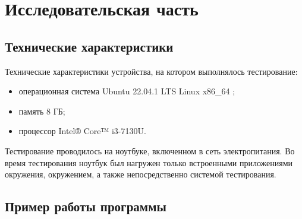 \chapter{Исследовательская часть}

\section{Технические характеристики}

Технические характеристики устройства, на котором выполнялось тестирование:
\begin{itemize}
	\item операционная система Ubuntu 22.04.1 LTS Linux x86\_64 \cite{ubuntu};
	\item память 8 ГБ;
	\item процессор Intel® Core™ i3-7130U.
\end{itemize}

Тестирование проводилось на ноутбуке, включенном в сеть электропитания. Во время тестирования ноутбук был нагружен только встроенными приложениями окружения, окружением, а также непосредственно системой тестирования.

\section{Пример работы программы}

